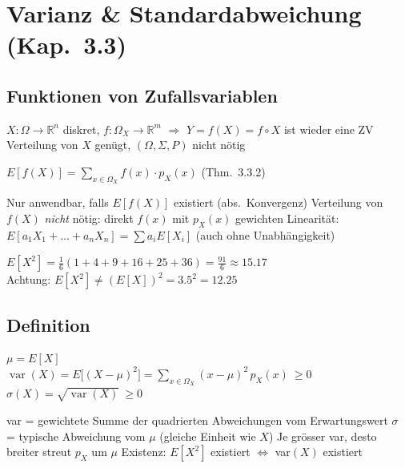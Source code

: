 \section{Varianz \& Standardabweichung (Kap.\ 3.3)}

\subsection{Funktionen von Zufallsvariablen}
\begin{merke}[{{Idee}}]
\begin{itemize}
\pfeil $X:\Omega\to\mathbb R^n$ diskret, $f:\Omega_X\to\mathbb R^m$ $\Rightarrow$ $Y=f(X)=f\circ X$ ist wieder eine ZV
\pfeil Verteilung von $X$ genügt, $(\Omega,\Sigma,P)$ nicht nötig
\end{itemize}
\end{merke}
\begin{formel}
$\displaystyle E[f(X)]=\sum_{x\in\Omega_X} f(x)\cdot p_X(x)$ \quad (Thm.\ 3.3.2)
\end{formel}
\begin{itemize}
\pfeil Nur anwendbar, falls $E[f(X)]$ existiert (abs.\ Konvergenz)
\pfeil Verteilung von $f(X)$ \emph{nicht} nötig: direkt $f(x)$ mit $p_X(x)$ gewichten
\pfeil Linearität: $E[a_1X_1+\dots+a_nX_n]=\sum a_iE[X_i]$ (auch ohne Unabhängigkeit)
\end{itemize}
\begin{bsp}[{{$X$ = Augenzahl Würfel, $f(x)=x^2$}}]
$E[X^2]=\tfrac16(1+4+9+16+25+36)=\tfrac{91}{6}\approx15.17$\\
Achtung: $E[X^2]\neq(E[X])^2=3.5^2=12.25$
\end{bsp}

\subsection{Definition}
\begin{formel}
$\mu=E[X]$\\[1pt]
$\displaystyle \operatorname{var}(X)=E\big[(X-\mu)^2\big]=\sum_{x\in\Omega_X}(x-\mu)^2\,p_X(x)\ \ge0$\\[1pt]
$\sigma(X)=\sqrt{\operatorname{var}(X)}\ \ge0$
\end{formel}
\begin{itemize}
\pfeil var = gewichtete Summe der quadrierten Abweichungen vom Erwartungswert
\pfeil $\sigma$ = typische Abweichung vom $\mu$ (gleiche Einheit wie $X$)
\pfeil Je grösser var, desto breiter streut $p_X$ um $\mu$
\pfeil Existenz: $E[X^2]$ existiert $\Leftrightarrow$ var$(X)$ existiert
\end{itemize}

